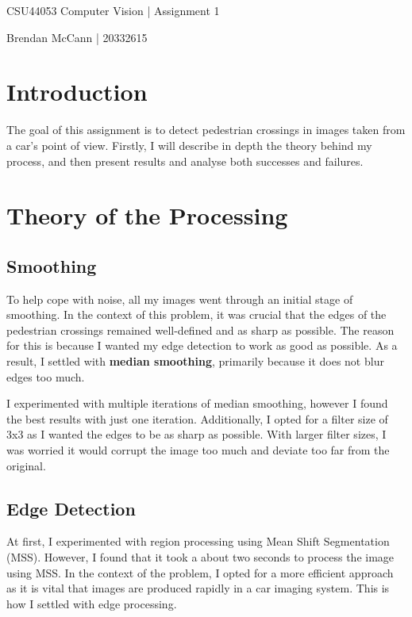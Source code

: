 \documentclass{article}  %
\begin{document}
	
	\begin{center}
		\begin{Large}
			CSU44053 Computer Vision | Assignment 1
			
			Brendan McCann | 20332615
		\end{Large}
	\end{center}
	
	\section*{Introduction}
	
	The goal of this assignment is to detect pedestrian crossings in images taken from a car's point of view. Firstly, I will describe in depth the theory behind my process, and then present results and analyse both successes and failures.
	
	\section{Theory of the Processing}
	
	\subsection{Smoothing}
	
	To help cope with noise, all my images went through an initial stage of smoothing. In the context of this problem, it was crucial that the edges of the pedestrian crossings remained well-defined and as sharp as possible. The reason for this is because I wanted my edge detection to work as good as possible. As a result, I settled with \textbf{median smoothing}, primarily because it does not blur edges too much.
	
	I experimented with multiple iterations of median smoothing, however I found the best results with just one iteration. Additionally, I opted for a filter size of 3x3 as I wanted the edges to be as sharp as possible. With larger filter sizes, I was worried it would corrupt the image too much and deviate too far from the original.
	
	\subsection{Edge Detection}
	
	At first, I experimented with region processing using Mean Shift Segmentation (MSS). However, I found that it took a about two seconds to process the image using MSS. In the context of the problem, I opted for a more efficient approach as it is vital that images are produced rapidly in a car imaging system. This is how I settled with edge processing.
	
\end{document}
